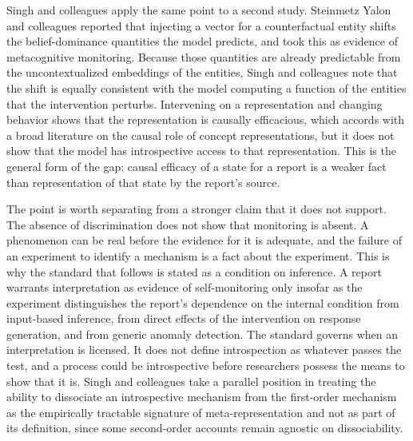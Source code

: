 \documentclass[11pt]{article}
\theoremstyle{definition}
\theoremstyle{remark}
\begin{document}
Singh and colleagues apply the same point to a second study. Steinmetz Yalon and colleagues \citeyearpar{steinmetz2026} reported that injecting a vector for a counterfactual entity shifts the belief-dominance quantities the model predicts, and took this as evidence of metacognitive monitoring. Because those quantities are already predictable from the uncontextualized embeddings of the entities, Singh and colleagues note that the shift is equally consistent with the model computing a function of the entities that the intervention perturbs. Intervening on a representation and changing behavior shows that the representation is causally efficacious, which accords with a broad literature on the causal role of concept representations, but it does not show that the model has introspective access to that representation. This is the general form of the gap: causal efficacy of a state for a report is a weaker fact than representation of that state by the report's source.

The point is worth separating from a stronger claim that it does not support. The absence of discrimination does not show that monitoring is absent. A phenomenon can be real before the evidence for it is adequate, and the failure of an experiment to identify a mechanism is a fact about the experiment. This is why the standard that follows is stated as a condition on inference. A report warrants interpretation as evidence of self-monitoring only insofar as the experiment distinguishes the report's dependence on the internal condition from input-based inference, from direct effects of the intervention on response generation, and from generic anomaly detection. The standard governs when an interpretation is licensed. It does not define introspection as whatever passes the test, and a process could be introspective before researchers possess the means to show that it is. Singh and colleagues take a parallel position in treating the ability to dissociate an introspective mechanism from the first-order mechanism as the empirically tractable signature of meta-representation and not as part of its definition, since some second-order accounts remain agnostic on dissociability.
\end{document}
